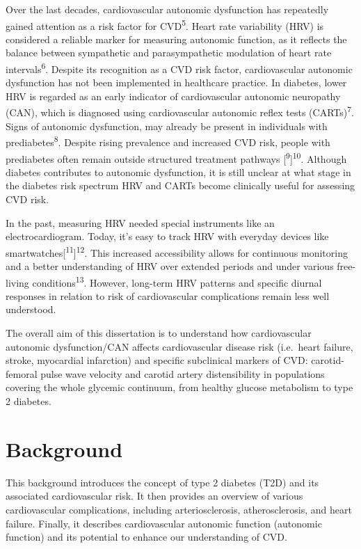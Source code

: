 \documentclass[
  a4paper,
  headsepline=true,
  open=any]{scrbook}
\begin{document}
Over the last decades, cardiovascular autonomic dysfunction has
repeatedly gained attention as a risk factor for CVD\textsuperscript{5}.
Heart rate variability (HRV) is considered a reliable marker for
measuring autonomic function, as it reflects the balance between
sympathetic and parasympathetic modulation of heart rate
intervals\textsuperscript{6}. Despite its recognition as a CVD risk
factor, cardiovascular autonomic dysfunction has not been implemented in
healthcare practice. In diabetes, lower HRV is regarded as an early
indicator of cardiovascular autonomic neuropathy (CAN), which is
diagnosed using cardiovascular autonomic reflex tests
(CARTs)\textsuperscript{7}. Signs of autonomic dysfunction, may already
be present in individuals with prediabetes\textsuperscript{8}. Despite
rising prevalence and increased CVD risk, people with prediabetes often
remain outside structured treatment pathways
{[}\textsuperscript{9}{]}\textsuperscript{10}. Although diabetes
contributes to autonomic dysfunction, it is still unclear at what stage
in the diabetes risk spectrum HRV and CARTs become clinically useful for
assessing CVD risk.

In the past, measuring HRV needed special instruments like an
electrocardiogram. Today, it's easy to track HRV with everyday devices
like smartwatches{[}\textsuperscript{11}{]}\textsuperscript{12}. This
increased accessibility allows for continuous monitoring and a better
understanding of HRV over extended periods and under various free-living
conditions\textsuperscript{13}. However, long-term HRV patterns and
specific diurnal responses in relation to risk of cardiovascular
complications remain less well understood.

The overall aim of this dissertation is to understand how cardiovascular
autonomic dysfunction/CAN affects cardiovascular disease risk
(i.e.~heart failure, stroke, myocardial infarction) and specific
subclinical markers of CVD: carotid-femoral pulse wave velocity and
carotid artery distensibility in populations covering the whole glycemic
continuum, from healthy glucose metabolism to type 2 diabetes.


\hypertarget{background}{%
\chapter{Background}\label{background}}

This background introduces the concept of type 2 diabetes (T2D) and its
associated cardiovascular risk. It then provides an overview of various
cardiovascular complications, including arteriosclerosis,
atherosclerosis, and heart failure. Finally, it describes cardiovascular
autonomic function (autonomic function) and its potential to enhance our
understanding of CVD.
\end{document}
